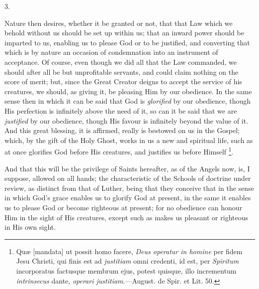 3.

Nature then desires, whether it be granted or not, that that Law
which we behold without us should be set up within us; that an inward
power should be imparted to us, enabling us to please God or to be
justified, and converting that which is by nature an occasion of
condemnation into an instrument of acceptance. Of course, even though
we did all that the Law commanded, we should after all be but
unprofitable servants, and could claim nothing on the score of merit;
but, since the Great Creator deigns to accept the service of his
creatures, we should, as giving it, be pleasing Him by our obedience.
In the same sense then in which it can be said that God is \emph{glorified}
by our obedience, though His perfection is infinitely above the need
of it, so can it be said that we are \emph{justified} by our
obedience, though His favour is infinitely beyond the value of it. And
this great blessing, it is affirmed, really is bestowed on us in the
Gospel; which, by the gift of the Holy Ghost, works in us a new and
spiritual life, such as at once glorifies God before His creatures,
and justifies us before Himself \footnote{Quæ [mandata]
ut possit homo facere, \emph{Deus operatur in homine} per fidem Jesu
Christi, qui finis est ad \emph{justitiam} omni credenti, id est, per \emph{Spiritum}
incorporatus factusque membrum ejus, potest quisque, illo incrementum \emph{intrinsecus}
dante, \emph{operari justitiam}.—August. de Spir. et Lit. 50.}.

And that this will be the privilege of Saints hereafter, as of the
Angels now, is, I suppose, allowed on all hands; the characteristic of
the Schools of doctrine under review, as distinct from that of Luther,
being that they conceive that in the sense in which God's grace
enables us to glorify God at present, in the same it enables us to
please God or become righteous at present; for no obedience can honour
Him in the sight of His creatures, except such as makes us pleasant or
righteous in His own sight.

